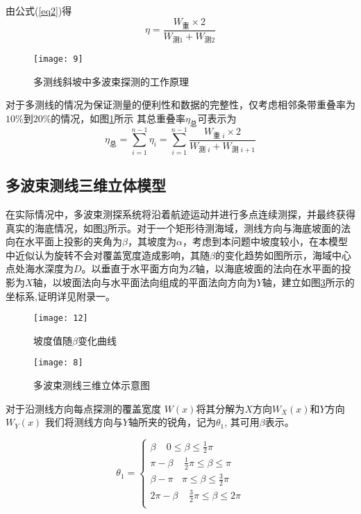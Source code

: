 \documentclass[11pt,twoside,a4paper]{article}
\begin{document}
	由公式(\ref{eq2})得	
	\begin{equation}
		\eta=\frac{W_\text{重} \times 2}{W_\text{测1}+W_\text{测2}}
	\end{equation}

\begin{figure}[h]
	\centering
	\texttt{[image: 9]}
	\caption{多测线斜坡中多波束探测的工作原理}
	\label{7}
\end{figure}
对于多测线的情况为保证测量的便利性和数据的完整性，仅考虑相邻条带重叠率为$10\%$到$20\%$的情况，如图\ref{7}所示
其总重叠率$\eta_\text{总}$可表示为
\begin{equation}
	\eta_\text{总}=\sum_{i=1}^{n-1} \eta_i=\sum_{i=1}^{n-1} \frac{W_{\text {重 } i} \times 2}{W_{\text {测 } i}+W_{\text {测 } i+1}}
\end{equation}


\subsection{多波束测线三维立体模型}
在实际情况中，多波束测探系统将沿着航迹运动并进行多点连续测探，并最终获得真实的海底情况，如图\ref{6}所示。对于一个矩形待测海域，测线方向与海底坡面的法向在水平面上投影的夹角为$\beta$，其坡度为$\alpha$，考虑到本问题中坡度较小，在本模型中近似认为旋转不会对覆盖宽度造成影响，其随$\beta$的变化趋势如图所示，海域中心点处海水深度为$D$。以垂直于水平面方向为$Z$轴，以海底坡面的法向在水平面的投影为$X$轴，以坡面法向与水平面法向组成的平面法向方向为$Y$轴，建立如图\ref{6}所示的坐标系,证明详见附录一。
 \begin{figure}[h]
	\centering
	\texttt{[image: 12]}
	\caption{坡度值随$\beta$变化曲线}
	\label{10}
\end{figure}



 \begin{figure}[h]
	\centering
	\texttt{[image: 8]}
	\caption{多波束测线三维立体示意图}
	\label{6}
\end{figure}


对于沿测线方向每点探测的覆盖宽度 $W(x)$将其分解为$X$方向$W_X(x)$和$Y$方向$W_Y(x)$
我们将测线方向与$Y$轴所夹的锐角，记为$\theta_1$,	其可用$\beta$表示。

\begin{equation}
	\theta_1=\left\{\begin{array}{l}
	     \beta   \   \    \  \   \   0 \leq \beta \leq \frac{1}{2} \pi\\
	     \pi-\beta   \   \    \  \ \ \frac{1}{2} \pi \leq \beta \leq \pi\\
	     \beta-\pi  \   \    \  \  \pi \leq \beta \leq \frac{3}{2}\pi\\
	     2\pi-\beta   \   \    \   \ \  \frac{3}{2} \pi \leq \beta \leq 2\pi\\
		
	\end{array}\right.
\end{equation}
\end{document}
